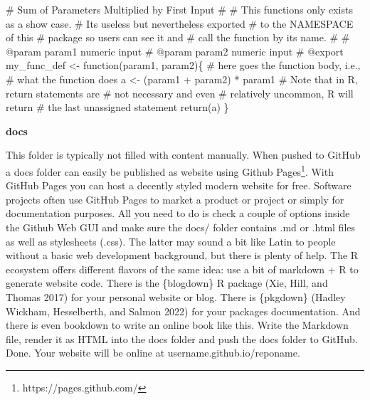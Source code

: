 \documentclass[
  12pt,
  letterpaper,
]{krantz}
\newenvironment{Shaded}{\begin{snugshade}}{\end{snugshade}}
\newcommand{\CommentTok}[1]{\textcolor[rgb]{0.37,0.37,0.37}{#1}}
\newcommand{\ControlFlowTok}[1]{\textcolor[rgb]{0.00,0.23,0.31}{#1}}
\newcommand{\FunctionTok}[1]{\textcolor[rgb]{0.28,0.35,0.67}{#1}}
\newcommand{\NormalTok}[1]{\textcolor[rgb]{0.00,0.23,0.31}{#1}}
\newcommand{\OtherTok}[1]{\textcolor[rgb]{0.00,0.23,0.31}{#1}}
\newcommand{\SpecialCharTok}[1]{\textcolor[rgb]{0.37,0.37,0.37}{#1}}
\begin{document}
\begin{Shaded}
\begin{Highlighting}[]
\CommentTok{\#\textquotesingle{} Sum of Parameters Multiplied by First Input}
\CommentTok{\#\textquotesingle{}}
\CommentTok{\#\textquotesingle{} This functions only exists as a show case. }
\CommentTok{\#\textquotesingle{} It\textquotesingle{}s useless but nevertheless exported}
\CommentTok{\#\textquotesingle{} to the NAMESPACE of this}
\CommentTok{\#\textquotesingle{} package so users can see it and}
\CommentTok{\#\textquotesingle{}  call the function by it\textquotesingle{}s name.}
\CommentTok{\#\textquotesingle{}}
\CommentTok{\#\textquotesingle{} @param param1 numeric input }
\CommentTok{\#\textquotesingle{} @param param2 numeric input }
\CommentTok{\#\textquotesingle{} @export}
\NormalTok{my\_func\_def }\OtherTok{\textless{}{-}} \ControlFlowTok{function}\NormalTok{(param1, param2)\{}
  \CommentTok{\# here goes the function body, i.e.,}
  \CommentTok{\# what the function does}
\NormalTok{  a }\OtherTok{\textless{}{-}}\NormalTok{ (param1 }\SpecialCharTok{+}\NormalTok{ param2) }\SpecialCharTok{*}\NormalTok{ param1}
  \CommentTok{\# Note that in R, return statements are}
  \CommentTok{\# not necessary and even}
  \CommentTok{\# relatively uncommon, R will return}
  \CommentTok{\# the last unassigned statement}
  \FunctionTok{return}\NormalTok{(a)}
\NormalTok{\}}
\end{Highlighting}
\end{Shaded}

\textbf{docs}

This folder is typically not filled with content manually. When pushed
to GitHub a docs folder can easily be published as website
using Github Pages\footnote{https://pages.github.com/}. With GitHub
Pages you can host a decently styled modern website for free. Software
projects often use GitHub Pages to market a product or project or simply
for documentation purposes. All you need to do is check a couple of
options inside the Github Web GUI and make sure the docs/ folder
contains .md or .html files as well as stylesheets (.css). The latter
may sound a bit like Latin to people without a basic web development
background, but there is plenty of help. The R ecosystem offers
different flavors of the same idea: use a bit of markdown + R to
generate website code. There is the \{blogdown\} R package (Xie, Hill,
and Thomas 2017) for your personal website or blog. There is \{pkgdown\}
(Hadley Wickham, Hesselberth, and Salmon 2022) for your packages
documentation. And there is even bookdown to write an online book like
this. Write the Markdown file, render it as HTML into the
docs folder and push the docs folder to GitHub. Done. Your website will
be online at username.github.io/reponame.
\end{document}
